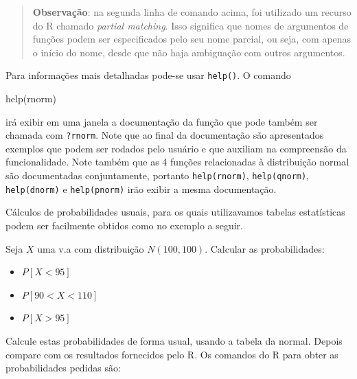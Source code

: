 \documentclass[
  10pt,
  a4paper]{book}
\newenvironment{Shaded}{\begin{snugshade}}{\end{snugshade}}
\newcommand{\FunctionTok}[1]{\textcolor[rgb]{0.00,0.00,0.00}{#1}}
\newcommand{\NormalTok}[1]{#1}
\providecommand{\tightlist}{%
  \setlength{\itemsep}{0pt}\setlength{\parskip}{0pt}}
\begin{document}
\begin{quote}
\textbf{Observação}: na segunda linha de comando acima, foi utilizado um
recurso do R chamado \emph{partial matching}. Isso significa que nomes de
argumentos de funções podem ser especificados pelo seu nome parcial,
ou seja, com apenas o início do nome, desde que não haja ambiguação
com outros argumentos.
\end{quote}

Para informações mais detalhadas pode-se usar \texttt{help()}. O comando

\begin{Shaded}
\begin{Highlighting}[]
\FunctionTok{help}\NormalTok{(rnorm)}
\end{Highlighting}
\end{Shaded}

irá exibir em uma janela a documentação da função que pode também ser
chamada com \texttt{?rnorm}. Note que ao final da documentação são apresentados
exemplos que podem ser rodados pelo usuário e que auxiliam na
compreensão da funcionalidade. Note também que as 4 funções relacionadas
à distribuição normal são documentadas conjuntamente, portanto
\texttt{help(rnorm)}, \texttt{help(qnorm)}, \texttt{help(dnorm)} e \texttt{help(pnorm)} irão exibir
a mesma documentação.

Cálculos de probabilidades usuais, para os quais utilizavamos tabelas
estatísticas podem ser facilmente obtidos como no exemplo a seguir.

Seja \(X\) uma v.a com distribuição \(N(100, 100)\). Calcular as
probabilidades:

\begin{itemize}
\tightlist
\item
  \(P[X < 95]\)
\item
  \(P[90 < X < 110]\)
\item
  \(P[X > 95]\)
\end{itemize}

Calcule estas probabilidades de forma usual, usando a tabela da normal.
Depois compare com os resultados fornecidos pelo R. Os comandos do R para
obter as probabilidades pedidas são:
\end{document}
